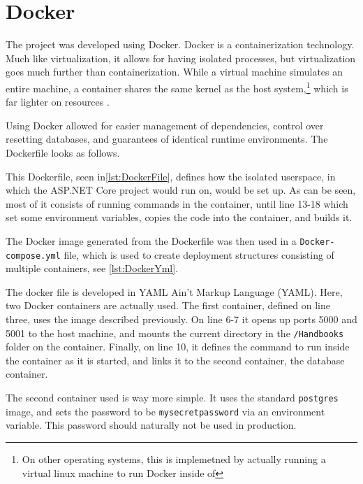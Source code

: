 \section{Docker}
The project was developed using Docker.
Docker is a containerization technology.
Much like virtualization, it allows for having isolated processes, but virtualization goes much further than containerization.
While a virtual machine simulates an entire machine, a container shares the same kernel as the host system,\footnote{On other operating systems, this is implemetned by actually running a virtual linux machine to run Docker inside of} which is far lighter on resources \cite{docker}.

Using Docker allowed for easier management of dependencies, control over resetting databases, and guarantees of identical runtime environments.
The Dockerfile looks as follows.

This Dockerfile, seen in\cref{lst:DockerFile}, defines how the isolated userspace, in which the ASP.NET Core project would run on, would be set up.
As can be seen, most of it consists of running commands in the container, until line 13-18 which set some environment variables, copies the code into the container, and builds it.

The Docker image generated from the Dockerfile was then used in a \texttt{Docker-compose.yml} file, which is used to create deployment structures consisting of multiple containers, see \cref{lst:DockerYml}.

The docker file is developed in YAML Ain't Markup Language (YAML).
Here, two Docker containers are actually used.
The first container, defined on line three, uses the image described previously.
On line 6-7 it opens up ports 5000 and 5001 to the host machine, and mounts the current directory in the \texttt{/Handbooks} folder on the container.
Finally, on line 10, it defines the command to run inside the container as it is started, and links it to the second container, the database container.

The second container used is way more simple.
It uses the standard \texttt{postgres} image, and sets the password to be \texttt{mysecretpassword} via an environment variable.
This password should naturally not be used in production.
